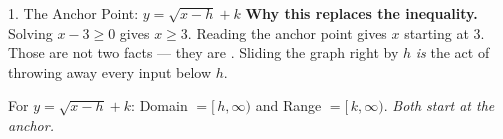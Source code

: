 \documentclass[10pt]{article}
\begin{document}
\begin{notesbox}{1. The Anchor Point: $y=\sqrt{x-h}+k$}
\vspace{2pt}
\textbf{Why this replaces the inequality.} Solving $x-3\ge0$ gives $x\ge 3$. Reading the anchor
point gives $x$ starting at $3$. Those are not two facts --- they are \blank{4.0cm}. Sliding the
graph right by $h$ \emph{is} the act of throwing away every input below $h$.
\begin{center}
\begin{tcolorbox}[colback=forestbg, colframe=forest, boxrule=0.7pt, arc=1.5mm, width=0.92\linewidth,
    left=3mm, right=3mm, top=1.5mm, bottom=1.5mm]
\centering\small
For $y=\sqrt{x-h}+k$: \quad Domain $=[\,h,\infty)$ \quad and \quad Range $=[\,k,\infty)$.
\emph{Both start at the anchor.}
\end{tcolorbox}
\end{center}
\end{notesbox}
\end{document}
